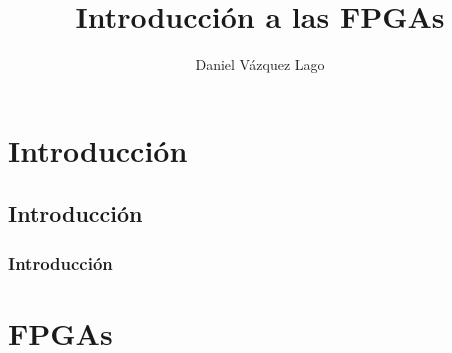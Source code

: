 \documentclass{/home/daniel/GitHub/CITIUS/Apuntes/Template}
\title{\Huge \textbf{Introducción a las FPGAs}}
\author{\Large Daniel Vázquez Lago}
\begin{document}
\maketitle
\tableofcontents
\chapter{Introducción}

\section{Introducción} 

\subsection{Introducción}


\chapter{FPGAs}
\end{document}
